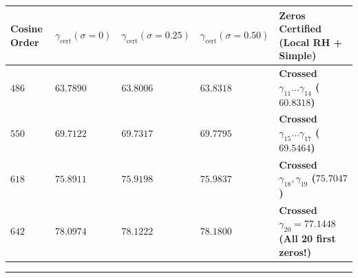 \documentclass[
  11pt,
]{article}
\newcounter{none} %
\begin{document}
\begin{enumerate}
  {\def\LTcaptype{none} %
  \begin{longtable}[]{@{}
    >{\centering\arraybackslash}p{}
    >{\centering\arraybackslash}p{}
    >{\centering\arraybackslash}p{}
    >{\centering\arraybackslash}p{}
    >{\raggedright\arraybackslash}p{}@{}}
  \toprule\noalign{}
  \begin{minipage}[b]{\linewidth}\centering
  Cosine Order
  \end{minipage} & \begin{minipage}[b]{\linewidth}\centering
  \(\gamma_{\text{cert}}(\sigma = 0)\)
  \end{minipage} & \begin{minipage}[b]{\linewidth}\centering
  \(\gamma_{\text{cert}}(\sigma = 0.25)\)
  \end{minipage} & \begin{minipage}[b]{\linewidth}\centering
  \(\gamma_{\text{cert}}(\sigma = 0.50)\)
  \end{minipage} & \begin{minipage}[b]{\linewidth}\raggedright
  Zeros Certified (Local RH + Simple)
  \end{minipage} \\
  \midrule\noalign{}
  \endhead
  \bottomrule\noalign{}
  \endlastfoot
  \textbf{\(486\)} & \textbf{\(63.7890\)} & \textbf{\(63.8006\)} &
  \textbf{\(63.8318\)} & \textbf{Crossed
  \(\gamma_{11} \dots \gamma_{14}\) (\(60.8318\))} \\
  \textbf{\(550\)} & \textbf{\(69.7122\)} & \textbf{\(69.7317\)} &
  \textbf{\(69.7795\)} & \textbf{Crossed
  \(\gamma_{15} \dots \gamma_{17}\) (\(69.5464\))} \\
  \textbf{\(618\)} & \textbf{\(75.8911\)} & \textbf{\(75.9198\)} &
  \textbf{\(75.9837\)} & \textbf{Crossed \(\gamma_{18}, \gamma_{19}\)
  (\(75.7047\))} \\
  \textbf{\(642\)} & \textbf{\(78.0974\)} & \textbf{\(78.1222\)} &
  \textbf{\(78.1800\)} & \textbf{Crossed \(\gamma_{20} = 77.1448\) (All
  20 first zeros!)} \\
  \end{longtable}
  }
\end{enumerate}

\begin{center}\rule{0.5\linewidth}{0.5pt}\end{center}
\end{document}
